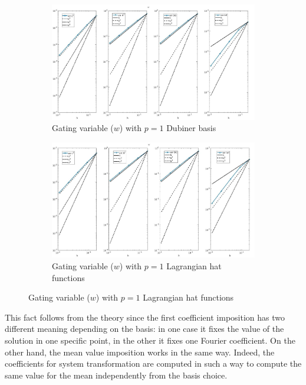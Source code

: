 \documentclass[a4paper,11pt]{article}
\begin{document}
\begin{figure}[H] 
	\caption{Comparison of the gating variable ($w$)}
	\label{w_1_mean}
	\begin{subfigure}{\textwidth}
		\begin{center}
			\includegraphics[width = \textwidth]{./errors/D1_w_2.jpg}
			\caption{Gating variable ($w$) with $p=1$ Dubiner basis}
		\end{center}
	\end{subfigure}
	\begin{subfigure}{\textwidth}
		\begin{center}
			\includegraphics[width =\textwidth]{./errors/P1_w_2.jpg}
			\caption{Gating variable ($w$) with $p=1$ Lagrangian hat functions}
		\end{center}
	\end{subfigure}
\end{figure}

\noindent This fact follows from the theory since the first coefficient imposition has two different meaning depending on the basis: in one case it fixes the value of the solution in one specific point, in the other it fixes one Fourier coefficient. On the other hand, the mean value imposition works in the same way. Indeed, the coefficients for system transformation are computed in such a way to compute the same value for the mean independently from the basis choice.
\restoregeometry
\newpage
\end{document}

